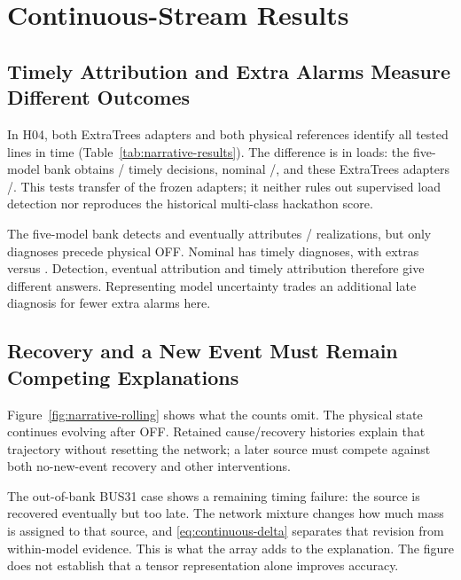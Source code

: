\section{Continuous-Stream Results}
\label{sec:narrative-results}

\subsection{Timely Attribution and Extra Alarms Measure Different Outcomes}



In H04, both ExtraTrees adapters and both physical references identify all tested lines in time (Table~\ref{tab:narrative-results}). The difference is in loads: the five-model bank obtains \NarMixLoadTimely{}/\NarMixLoadTotal{} timely decisions, nominal \NarNomLoadTimely{}/\NarNomLoadTotal{}, and these ExtraTrees adapters \NarETLoadTimely{}/\NarETLoadTotal{}. This tests transfer of the frozen adapters; it neither rules out supervised load detection nor reproduces the historical multi-class hackathon score.

The five-model bank detects and eventually attributes \NarMixJoint{}/\NarMixEvents{} realizations, but only \ContMixTimely{} diagnoses precede physical OFF. Nominal has \ContNomTimely{} timely diagnoses, with \ContNomExtras{} extras versus \ContMixExtras{}. Detection, eventual attribution and timely attribution therefore give different answers. Representing model uncertainty trades an additional late diagnosis for fewer extra alarms here.

\subsection{Recovery and a New Event Must Remain Competing Explanations}

Figure~\ref{fig:narrative-rolling} shows what the counts omit. The physical state continues evolving after OFF. Retained cause/recovery histories explain that trajectory without resetting the network; a later source must compete against both no-new-event recovery and other interventions.



The out-of-bank BUS31 case shows a remaining timing failure: the source is recovered eventually but too late. The network mixture changes how much mass is assigned to that source, and \eqref{eq:continuous-delta} separates that revision from within-model evidence. This is what the array adds to the explanation. The figure does not establish that a tensor representation alone improves accuracy.

